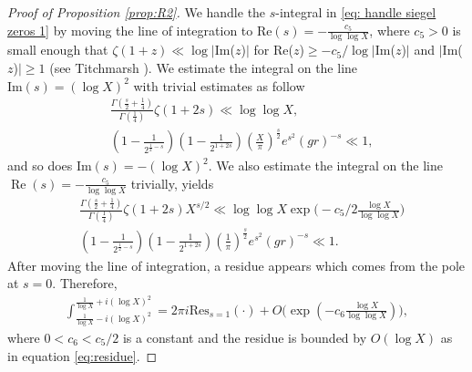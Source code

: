 \documentclass[12pt,reqno]{amsart}
\numberwithin{equation}{section}
\theoremstyle{plain}
\theoremstyle{definition}
\theoremstyle{remark}
\renewcommand{\Re}{\operatorname{Re}}
\begin{document}
\begin{proof}[Proof of Proposition \ref{prop:R2}]
We handle the $s$-integral in \eqref{eq: handle siegel zeros 1} by moving the line of integration to $\text{Re}(s) = -\frac{c_5}{\log \log X}$, where $c_5>0$ is small enough that  $\zeta (1+z) \ll \log \vert $Im($z$)$\vert $ for Re($z$)$\geqslant -c_5/\log \vert$Im($z$)$\vert $ and $\vert$Im($z$)$\vert $$\geqslant 1$ (see Titchmarsh \cite[Theorem 3.5 and Eq. (3.11.8)]{Ti86}).
We estimate the integral on the line $\text{Im}(s)=(\log X)^2$ with trivial estimates as follow
\begin{equation*}
  \begin{split}
  &\frac{\Gamma(\frac{s}{2}+\frac{1}{4})}{\Gamma(\frac{1}{4})}\zeta(1+2s) \ll \log \log X,\\
  &\left( 1-\frac{1}{2^{\frac{1}{2}-s}}\right)\left(1 - \frac{1}{2^{1+2s}}\right)\left(\frac{X}{\pi}\right)^{\frac{s}{2}}e^{s^2} \left( gr\right)^{-s} \ll 1 ,
  \end{split}
\end{equation*}
and so does $\text{Im}(s)=-(\log X)^2$.
We also estimate the integral on the line $\Re(s)=-\frac{c_5}{\log\log X}$ trivially, yields
\begin{equation*}
  \begin{split}
  &\frac{\Gamma(\frac{s}{2}+\frac{1}{4})}{\Gamma(\frac{1}{4})}\zeta(1+2s)X^{s/2} \ll \log \log X\exp\bigg(-c_5/2 \frac{\log X}{\log\log X}\bigg)  \\
  &\left( 1-\frac{1}{2^{\frac{1}{2}-s}}\right)\left(1 - \frac{1}{2^{1+2s}}\right)\left(\frac{1}{\pi}\right)^{\frac{s}{2}}e^{s^2} \left( gr\right)^{-s} \ll 1 .
  \end{split}
\end{equation*}
After moving the line of integration, a residue appears which comes from the pole at $s=0$.
Therefore,
\begin{equation}\label{eq: move the line of integration}
  \begin{split}
    \int_{\frac{1}{\log X}-i(\log X)^2}^{\frac{1}{\log X}+i(\log X)^2} =2\pi i \text{Res}_{s=1}(\cdot) +O\bigg(\exp(-c_6 \frac{\log X}{\log\log X})\bigg) ,
  \end{split}
\end{equation}
where $0<c_6<c_5/2$ is a constant and the residue is bounded by $O(\log X)$ as in equation \eqref{eq:residue}.


\end{proof}
\end{document}
